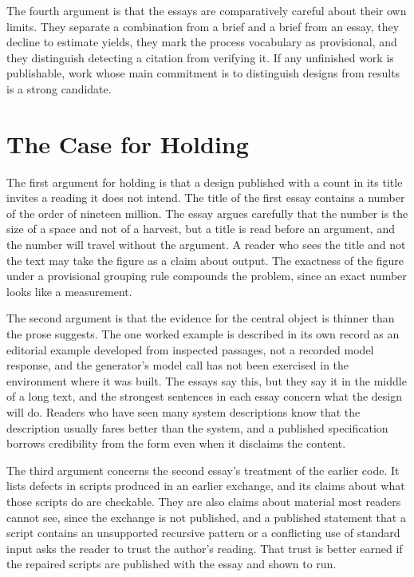 \documentclass[11pt]{article}
\begin{document}
The fourth argument is that the essays are comparatively careful about their own limits. They separate a combination from a brief and a brief from an essay, they decline to estimate yields, they mark the process vocabulary as provisional, and they distinguish detecting a citation from verifying it. If any unfinished work is publishable, work whose main commitment is to distinguish designs from results is a strong candidate.

\section{The Case for Holding}

The first argument for holding is that a design published with a count in its title invites a reading it does not intend. The title of the first essay contains a number of the order of nineteen million. The essay argues carefully that the number is the size of a space and not of a harvest, but a title is read before an argument, and the number will travel without the argument. A reader who sees the title and not the text may take the figure as a claim about output. The exactness of the figure under a provisional grouping rule compounds the problem, since an exact number looks like a measurement.

The second argument is that the evidence for the central object is thinner than the prose suggests. The one worked example is described in its own record as an editorial example developed from inspected passages, not a recorded model response, and the generator's model call has not been exercised in the environment where it was built. The essays say this, but they say it in the middle of a long text, and the strongest sentences in each essay concern what the design will do. Readers who have seen many system descriptions know that the description usually fares better than the system, and a published specification borrows credibility from the form even when it disclaims the content.

The third argument concerns the second essay's treatment of the earlier code. It lists defects in scripts produced in an earlier exchange, and its claims about what those scripts do are checkable. They are also claims about material most readers cannot see, since the exchange is not published, and a published statement that a script contains an unsupported recursive pattern or a conflicting use of standard input asks the reader to trust the author's reading. That trust is better earned if the repaired scripts are published with the essay and shown to run.
\end{document}
